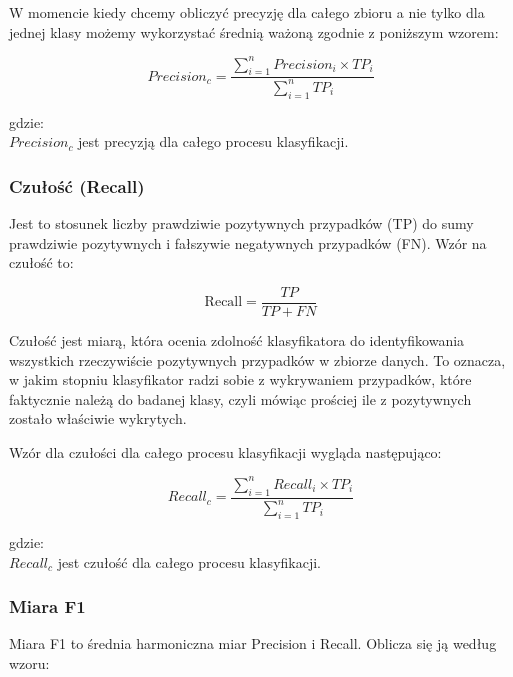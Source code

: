 \documentclass{article}
\begin{document}
\noindent W momencie kiedy chcemy obliczyć precyzję dla całego zbioru a nie tylko dla jednej klasy możemy wykorzystać średnią ważoną zgodnie z poniższym wzorem:

\begin{equation}
    Precision_c = \frac{\sum_{i=1}^{n} Precision_i \times TP_i}{\sum_{i=1}^{n} TP_i}
\end{equation}

\noindent gdzie: \\
$Precision_c$ jest precyzją dla całego procesu klasyfikacji.

\subsubsection*{Czułość (Recall)}

Jest to stosunek liczby prawdziwie pozytywnych przypadków (TP) do sumy prawdziwie pozytywnych i fałszywie negatywnych przypadków (FN). Wzór na czułość to: \newline

\begin{equation}
    \text{Recall} = \frac{TP}{TP + FN}
\end{equation}


\noindent Czułość jest miarą, która ocenia zdolność klasyfikatora do identyfikowania wszystkich rzeczywiście pozytywnych przypadków w zbiorze danych. To oznacza, w jakim stopniu klasyfikator radzi sobie z wykrywaniem przypadków, które faktycznie należą do badanej klasy, czyli mówiąc prościej ile z pozytywnych zostało właściwie wykrytych. \newline

\noindent Wzór dla czułości dla całego procesu klasyfikacji wygląda następująco:

\begin{equation}
    Recall_c = \frac{\sum_{i=1}^{n} Recall_i \times TP_i}{\sum_{i=1}^{n} TP_i}
\end{equation}

\noindent gdzie: \\
$Recall_c$ jest czułość dla całego procesu klasyfikacji.

\subsubsection*{Miara F1}

Miara F1 to średnia harmoniczna miar Precision i Recall. Oblicza się ją według wzoru: \newline
 
\end{document}
